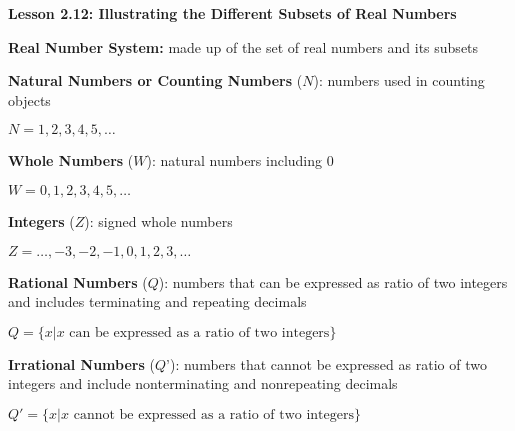 \begin{center}
\textbf{Lesson 2.12: Illustrating the Different Subsets of Real Numbers}
\end{center}

\vspace*{-1.5ex}

\noindent\textbf{Real Number System:} made up of the set of real numbers and its subsets

\noindent\textbf{Natural Numbers or Counting Numbers} (\(N\)): numbers used in counting objects

\(N = {1, 2, 3, 4, 5, \ldots}\)

\noindent\textbf{Whole Numbers} (\(W\)): natural numbers including 0

\(W = {0, 1, 2, 3, 4, 5, \ldots}\) 

\noindent\textbf{Integers} (\(Z\)): signed whole numbers

\(Z= {\ldots,-3, -2, -1, 0, 1, 2, 3,\ldots}\) 

\noindent\textbf{Rational Numbers} (\(Q\)): numbers that can be expressed as ratio of two integers and includes terminating and repeating decimals

\(Q = \{x| x \text{ can be expressed as a ratio of two integers}\}\) 

\noindent\textbf{Irrational Numbers} (\(Q’\)): numbers that cannot be expressed as ratio of two integers and include nonterminating and nonrepeating decimals

\(Q' = \{x| x \text{ cannot be expressed as a ratio of two integers}\}\)



